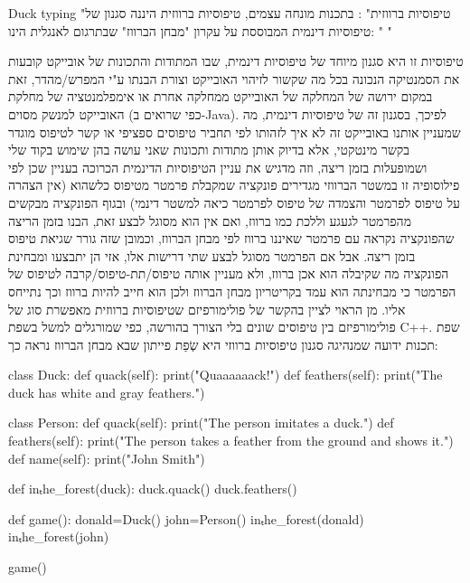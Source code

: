      Duck typing "טיפוסיות ברווזית" :
      בתכנות מונחה עצמים, טיפוסיות ברווזית היננה סגנון של טיפוסיות דינמית המבוססת על עקרון "מבחן הברווז" שבתרגום לאנגלית הינו:
      " "

      טיפוסיות זו היא סגנון מיוחד של טיפוסיות דינמית, שבו המתודות והתכונות של אובייקט
      קובעות את הסמנטיקה הנכונה בכל מה שקשור לזיהוי האובייקט וצורת הבנתו ע"י
      המפרש/מהדר, זאת במקום ירושה של המחלקה של האובייקט ממחלקה אחרת או אימפלמנטציה של
      מחלקת האובייקט למנשק מסוים (כפי שרואים ב-Java). לפיכך, בסגנון זה של טיפוסיות
      דינמית, מה שמעניין אותנו באובייקט זה לא איך לזהותו לפי תחביר טיפוסים ספציפי או
      קשר לטיפוס מוגדר בקשר מינטקטי, אלא בדיוק אותן מתודות ותכונות שאני עושה בהן
      שימוש בקוד שלי ושמופעלות בזמן ריצה, וזה מדגיש את עניין הטיפוסיות הדינמית הכרוכה
      בעניין שכן לפי פילוסופיה זו במשטר הברווזי מגדירים פונקציה שמקבלת פרמטר מטיפוס
      כלשהוא (אין הצהרה על טיפוס לפרמטר והצמדה של טיפוס לפרמטר כיאה למשטר דינמי)
      ובגוף הפונקציה מבקשים מהפרמטר לגעגע וללכת כמו ברווז, ואם אין הוא מסוגל לבצע
      זאת, הבנו בזמן הריצה שהפונקציה נקראה עם פרמטר שאיננו ברווז לפי מבחן הברווז,
      וכמובן שזה גורר שגיאת טיפוס בזמן ריצה. אבל אם הפרמטר מסוגל לבצע שתי דרישות אלו,
      אזי הן יתבצעו ומבחינת הפונקציה מה שקיבלה הוא אכן ברווז, ולא מעניין אותה
      טיפוס/תת-טיפוס/קרבה לטיפוס של הפרמטר כי מבחינתה הוא עמד בקריטריון מבחן הברווז
      ולכן הוא חייב להיות ברווז וכך נתייחס אליו. מן הראוי לציין בהקשר של פולימורפיזם
      שטיפוסיות ברווזית מאפשרת סוג של פולימורפיזם בין טיפוסים שונים בלי הצורך בהורשה,
      כפי שמורגלים למשל בשפת C++. שפת תכנות ידועה שמנהיגה סגנון טיפוסיות ברווזי היא
      שְׂפַת פייתון \Python שבא מבחן הברווז נראה כך:

\begin{PYTHON}
class Duck:
   def quack(self):
       print("Quaaaaaack!")
   def feathers(self):
       print("The duck has white and gray feathers.")

class Person:
   def quack(self):
       print("The person imitates a duck.")
   def feathers(self):
       print("The person takes a feather from the ground and shows it.")
   def name(self):
       print("John Smith")

def inₜhe_forest(duck):
   duck.quack()
   duck.feathers()

def game():
   donald=Duck()
   john=Person()
   inₜhe_forest(donald)
   inₜhe_forest(john)

game()
\end{PYTHON}

